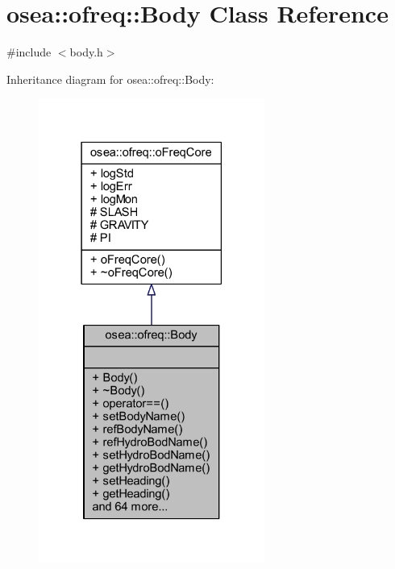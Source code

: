 \hypertarget{classosea_1_1ofreq_1_1_body}{\section{osea\-:\-:ofreq\-:\-:Body Class Reference}
\label{classosea_1_1ofreq_1_1_body}
}


{\ttfamily \#include $<$body.\-h$>$}



Inheritance diagram for osea\-:\-:ofreq\-:\-:Body\-:
\nopagebreak
\begin{figure}[H]
\begin{center}
\leavevmode
\includegraphics[width=210pt]{classosea_1_1ofreq_1_1_body__inherit__graph}
\end{center}
\end{figure}
